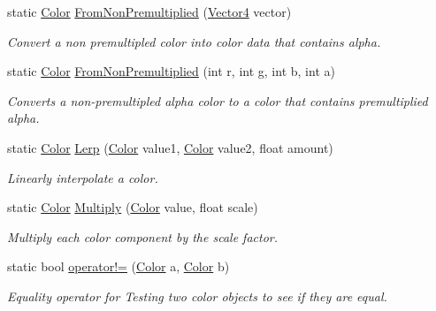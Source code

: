 \begin{DoxyCompactItemize}
\item 
static \hyperlink{structMicrosoft_1_1Xna_1_1Framework_1_1Color}{Color} \hyperlink{structMicrosoft_1_1Xna_1_1Framework_1_1Color_a08860aabc688978b0da44aaf6cdc2a68}{From\+Non\+Premultiplied} (\hyperlink{structMicrosoft_1_1Xna_1_1Framework_1_1Vector4}{Vector4} vector)
\begin{DoxyCompactList}\small\item\em Convert a non premultipled color into color data that contains alpha.\end{DoxyCompactList}\item 
static \hyperlink{structMicrosoft_1_1Xna_1_1Framework_1_1Color}{Color} \hyperlink{structMicrosoft_1_1Xna_1_1Framework_1_1Color_aa78a0bccbc458e1edb4cf41353f22f46}{From\+Non\+Premultiplied} (int r, int g, int b, int a)
\begin{DoxyCompactList}\small\item\em Converts a non-\/premultipled alpha color to a color that contains premultiplied alpha.\end{DoxyCompactList}\item 
static \hyperlink{structMicrosoft_1_1Xna_1_1Framework_1_1Color}{Color} \hyperlink{structMicrosoft_1_1Xna_1_1Framework_1_1Color_a93bb23f71e8900fe2b226d8bafe214b7}{Lerp} (\hyperlink{structMicrosoft_1_1Xna_1_1Framework_1_1Color}{Color} value1, \hyperlink{structMicrosoft_1_1Xna_1_1Framework_1_1Color}{Color} value2, float amount)
\begin{DoxyCompactList}\small\item\em Linearly interpolate a color.\end{DoxyCompactList}\item 
static \hyperlink{structMicrosoft_1_1Xna_1_1Framework_1_1Color}{Color} \hyperlink{structMicrosoft_1_1Xna_1_1Framework_1_1Color_ae9f74bf433cc02633ae12fcd45d22808}{Multiply} (\hyperlink{structMicrosoft_1_1Xna_1_1Framework_1_1Color}{Color} value, float scale)
\begin{DoxyCompactList}\small\item\em Multiply each color component by the scale factor.\end{DoxyCompactList}\item 
static bool \hyperlink{structMicrosoft_1_1Xna_1_1Framework_1_1Color_a076cf9a4d2e1aa55976bb84b59f425cb}{operator!=} (\hyperlink{structMicrosoft_1_1Xna_1_1Framework_1_1Color}{Color} a, \hyperlink{structMicrosoft_1_1Xna_1_1Framework_1_1Color}{Color} b)
\begin{DoxyCompactList}\small\item\em Equality operator for Testing two color objects to see if they are equal.\end{DoxyCompactList}\item 

\end{DoxyCompactItemize}
